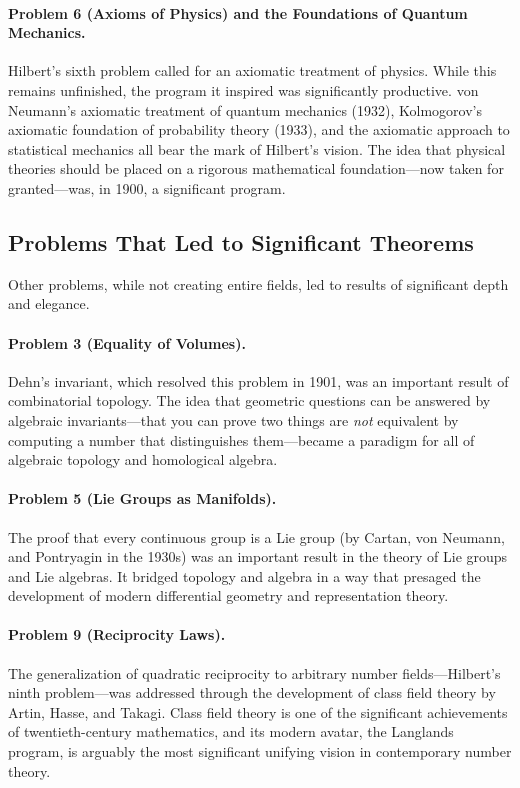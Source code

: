 \paragraph{Problem 6 (Axioms of Physics) and the Foundations of Quantum Mechanics.} Hilbert's sixth problem called for an axiomatic treatment of physics. While this remains unfinished, the program it inspired was significantly productive. von Neumann's axiomatic treatment of quantum mechanics (1932), Kolmogorov's axiomatic foundation of probability theory (1933), and the axiomatic approach to statistical mechanics all bear the mark of Hilbert's vision. The idea that physical theories should be placed on a rigorous mathematical foundation---now taken for granted---was, in 1900, a significant program.

\subsection{Problems That Led to Significant Theorems}

Other problems, while not creating entire fields, led to results of significant depth and elegance.

\paragraph{Problem 3 (Equality of Volumes).} Dehn's invariant, which resolved this problem in 1901, was an important result of combinatorial topology. The idea that geometric questions can be answered by algebraic invariants---that you can prove two things are \emph{not} equivalent by computing a number that distinguishes them---became a paradigm for all of algebraic topology and homological algebra.

\paragraph{Problem 5 (Lie Groups as Manifolds).} The proof that every continuous group is a Lie group (by Cartan, von Neumann, and Pontryagin in the 1930s) was an important result in the theory of Lie groups and Lie algebras. It bridged topology and algebra in a way that presaged the development of modern differential geometry and representation theory.

\paragraph{Problem 9 (Reciprocity Laws).} The generalization of quadratic reciprocity to arbitrary number fields---Hilbert's ninth problem---was addressed through the development of class field theory by Artin, Hasse, and Takagi. Class field theory is one of the significant achievements of twentieth-century mathematics, and its modern avatar, the Langlands program, is arguably the most significant unifying vision in contemporary number theory.

